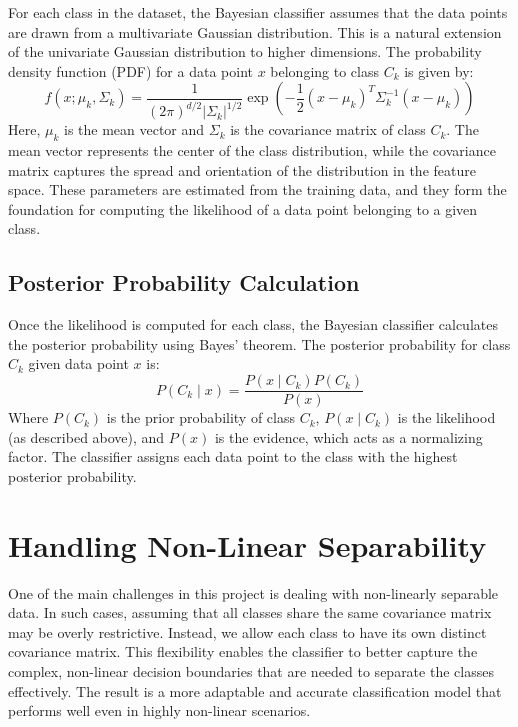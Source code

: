 \documentclass[conference]{IEEEtran}
\begin{document}
	For each class in the dataset, the Bayesian classifier assumes that the data points are drawn from a multivariate Gaussian distribution. This is a natural extension of the univariate Gaussian distribution to higher dimensions. The probability density function (PDF) for a data point \( x \) belonging to class \( C_k \) is given by:
	\[
	f(x; \mu_k, \Sigma_k) = \frac{1}{(2\pi)^{d/2} |\Sigma_k|^{1/2}} \exp\left(-\frac{1}{2} (x - \mu_k)^T \Sigma_k^{-1} (x - \mu_k)\right)
	\]
	Here, \( \mu_k \) is the mean vector and \( \Sigma_k \) is the covariance matrix of class \( C_k \). The mean vector represents the center of the class distribution, while the covariance matrix captures the spread and orientation of the distribution in the feature space. These parameters are estimated from the training data, and they form the foundation for computing the likelihood of a data point belonging to a given class.
	
	\subsection{Posterior Probability Calculation}
	
	Once the likelihood is computed for each class, the Bayesian classifier calculates the posterior probability using Bayes' theorem. The posterior probability for class \( C_k \) given data point \( x \) is:
	\[
	P(C_k \mid x) = \frac{P(x \mid C_k) P(C_k)}{P(x)}
	\]
	Where \( P(C_k) \) is the prior probability of class \( C_k \), \( P(x \mid C_k) \) is the likelihood (as described above), and \( P(x) \) is the evidence, which acts as a normalizing factor. The classifier assigns each data point to the class with the highest posterior probability.
	
	\section{Handling Non-Linear Separability}
	
	One of the main challenges in this project is dealing with non-linearly separable data. In such cases, assuming that all classes share the same covariance matrix may be overly restrictive. Instead, we allow each class to have its own distinct covariance matrix. This flexibility enables the classifier to better capture the complex, non-linear decision boundaries that are needed to separate the classes effectively. The result is a more adaptable and accurate classification model that performs well even in highly non-linear scenarios.
	
\end{document}
